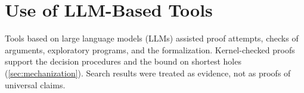 \section*{Use of LLM-Based Tools}

Tools based on large language models (LLMs) assisted proof attempts, checks of
arguments, exploratory programs, and the formalization. Kernel-checked proofs
support the decision procedures and the bound on shortest holes
(\cref{sec:mechanization}). Search results were treated as evidence, not as
proofs of universal claims.
